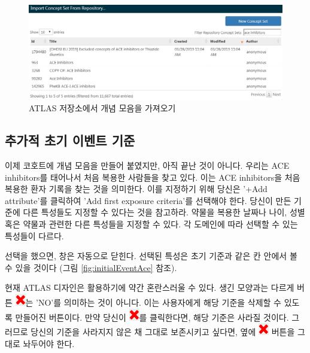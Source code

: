 \documentclass[11pt]{book}
\theoremstyle{definition}
\theoremstyle{definition}
\theoremstyle{definition}
\theoremstyle{remark}
\let\BeginKnitrBlock\begin \let\EndKnitrBlock\end
\begin{document}
\begin{figure}

{\centering \includegraphics[width=1\linewidth]{images/Cohorts/ATLAS-findingyourconcept} 

}

\caption{ATLAS 저장소에서 개념 모음을 가져오기}\label{fig:ATLASfindyourconcept}
\end{figure}

\subsection{추가적 초기 이벤트 기준}\label{---}

이제 코호트에 개념 모음을 만들어 붙였지만, 아직 끝난 것이 아니다. 우리는
ACE inhibitors를 태어나서 처음 복용한 사람들을 찾고 있다. 이는 ACE
inhibitors을 처음 복용한 환자 기록을 찾는 것을 의미한다. 이를 지정하기
위해 당신은 '+Add attribute'를 클릭하여 'Add first exposure criteria'를
선택해야 한다. 당신이 만든 기준에 다른 특성들도 지정할 수 있다는 것을
참고하라. 약물을 복용한 날짜나 나이, 성별 혹은 약물과 관련한 다른
특성들을 지정할 수 있다. 각 도메인에 따라 선택할 수 있는 특성들이
다르다.

선택을 했으면, 창은 자동으로 닫힌다. 선택된 특성은 초기 기준과 같은 칸
안에서 볼 수 있을 것이다 (그림 \ref{fig:initialEventAce} 참조).

\BeginKnitrBlock{rmdimportant}
현재 ATLAS 디자인은 활용하기에 약간 혼란스러울 수 있다. 생긴 모양과는
다르게 버튼 \includegraphics{images/Cohorts/redX.png}는 'NO'를 의미하는
것이 아니다. 이는 사용자에게 해당 기준을 삭제할 수 있도록 만들어진
버튼이다. 만약 당신이 \includegraphics{images/Cohorts/redX.png}를
클릭한다면, 해당 기준은 사라질 것이다. 그러므로 당신의 기준을 사라지지
않은 채 그대로 보존시키고 싶다면, 옆에
\includegraphics{images/Cohorts/redX.png} 버튼을 그대로 놔두어야 한다.
\EndKnitrBlock{rmdimportant}
\end{document}
